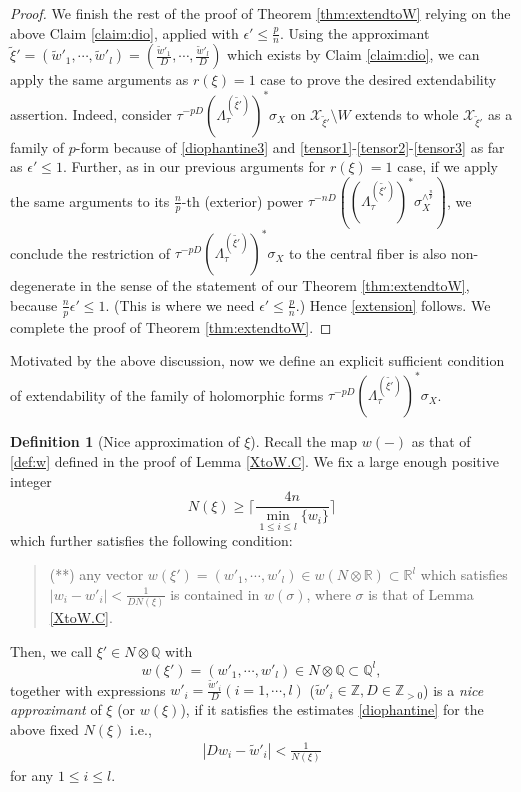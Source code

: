 \documentclass[12pt,a4paper]{amsart}
\theoremstyle{remark}
\theoremstyle{definition}
\newtheorem{defn}[Thm]{Definition}
\def\R{\mathbb{R}}
\def\Z{\mathbb{Z}}
\def\Q{\mathbb{Q}}
\def\X{\mathcal{X}}
\begin{document}
\begin{proof}
We finish the rest of the proof of Theorem \ref{thm:extendtoW} relying on the above Claim \ref{claim:dio}, applied with 
$\epsilon'\le \frac{p}{n}$. 
Using the approximant $\tilde{\xi}'=(\tilde{w}'_1,\cdots,\tilde{w}'_l)=(\frac{\tilde{w}'_1}{D},\cdots,\frac{\tilde{w}'_l}{D})$ which exists 
by Claim \ref{claim:dio}, 
we can apply 
the same arguments as $r(\xi)=1$ case to prove the 
desired extendability assertion. Indeed, 
consider $\tau^{-pD}(\Lambda_{\tau}^{(\tilde{\xi'})})^* \sigma_X$ on 
$\X_{\tilde{\xi}'}\setminus W$ 
extends to whole 
$\X_{\tilde{\xi}'}$ as a family of  
$p$-form because of \eqref{diophantine3} and 
\eqref{tensor1}-\eqref{tensor2}-\eqref{tensor3} 
as far as $\epsilon'\le 1$. 
Further, as in our previous arguments for $r(\xi)=1$ case, 
if we apply the same arguments to its $\frac{n}{p}$-th 
(exterior) power 
$\tau^{-nD}((\Lambda_{\tau}^{(\tilde{\xi'})})^* \sigma_X^{\wedge^{\frac{n}{p}}})$, we conclude 
the restriction of $\tau^{-pD}(\Lambda_{\tau}^{(\tilde{\xi'})})^* \sigma_X$ to the central fiber is also non-degenerate in the sense of the statement of our Theorem \ref{thm:extendtoW}, 
because $\frac{n}{p}\epsilon'\le 1$. 
(This is where we need $\epsilon'\le \frac{p}{n}$.) 
Hence \eqref{extension} follows. 
We complete the proof of Theorem \ref{thm:extendtoW}. 
\end{proof}

Motivated by the above discussion, 
now we define an explicit 
sufficient condition of extendability of 
the family of holomorphic forms 
$\tau^{-pD}(\Lambda_{\tau}^{(\tilde{\xi'})})^* \sigma_X$. 

\begin{defn}[Nice approximation of $\xi$]\label{def:nice}
Recall the map 
$w(-)$ as that of \eqref{def:w} defined in the proof of Lemma \ref{XtoW.C}. 
We fix a large enough positive integer 
$$N(\xi)\ge  \lceil \frac{4n}{\underset{1\le i\le l}\min\{w_i\}} \rceil$$ 
which further satisfies the following condition: 
\begin{quote}(**)
any vector $w(\xi')=(w'_1,\cdots,w'_l)\in w(N\otimes \R)\subset \R^l$ which satisfies 
$|w_i-w'_i|<\frac{1}{D N(\xi)}$ is contained in $w(\sigma)$, 
where $\sigma$ is that of Lemma \ref{XtoW.C}. 
\end{quote}

Then, we call $\xi'\in N\otimes \Q$ with 
$$w(\xi')=(w'_1,\cdots,w'_l)\in N\otimes \Q\subset \Q^l,$$ together with 
expressions $w'_i=\frac{\tilde{w}'_i}{D} (i=1,\cdots,l)$ ($\tilde{w}'_i\in \Z, 
D\in \Z_{>0}$) is a {\it nice approximant} of $\xi$ (or $w(\xi)$), if 
it satisfies the estimates  \eqref{diophantine} 
for the above fixed $N(\xi)$ i.e., 
\begin{align}\label{eqn:nice}
|Dw_i-\tilde{w}'_i|<
\frac{1}{N(\xi)}
\end{align}
for any $1\le i\le l$. 
\end{defn}
\end{document}
